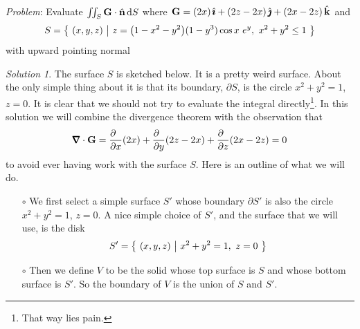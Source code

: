 \begin{eg}\label{eg:stokesD}
\noindent\textit{Problem}:
Evaluate
$
\iint_S\mathbf{G}\cdot\hat{\mathbf{n}}\,\mathrm{d}S
$
where $\mathbf{G}= (2x)\,\hat{\pmb{\imath}}+(2z-2x)\,\hat{\pmb{\jmath}} +(2x-2z)\,\hat{\mathbf{k}}$ 
and 
\begin{equation*}
S=\big\{ \ (x,y,z)\ \big|\ z=\big(1-x^2-y^2\big)(1-y^3)\cos x\ e^{y},\ x^2+y^2\le 1\ \big\}
\end{equation*}
with upward pointing normal

\medskip
\noindent\textit{Solution 1}. 
The surface $S$ is sketched below. It is a pretty weird surface. About the 
only simple thing about it is that its boundary, $\partial S$, is the circle
$x^2+y^2=1$, $z=0$.
It is clear that we should not try to evaluate the integral 
directly\footnote{That way lies pain.}.
In this solution we will combine the divergence theorem with the
observation that 
\begin{align*}
\vnabla\cdot\vG = \frac{\partial\hfill}{\partial x}(2x)+
                  \frac{\partial\hfill}{\partial y}(2z-2x)+
                  \frac{\partial\hfill}{\partial z}(2x-2z)
                =0
\end{align*}
to avoid ever having work with the surface $S$. Here is an outline of 
what we will do.
\begin{itemize}\itemsep1pt \parskip0pt  %
\item[$\circ$]
We first select a simple surface $S'$ whose boundary $\partial S'$ is also 
the circle $x^2+y^2=1$, $z=0$. A nice simple choice of $S'$, and the surface that we will use, is the disk
\begin{equation*}
S' =\Set{(x,y,z)}{x^2+y^2=1,\ z=0}
\end{equation*}
\item[$\circ$] 
Then we define $V$ to be the solid whose top surface is $S$ and 
whose bottom surface is $S'$. So the boundary of $V$ is the union of $S$ and
$S'$. 


\end{itemize}
\end{eg}

